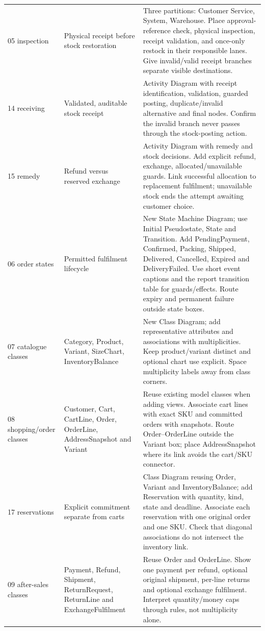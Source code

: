 \begin{longtable}{P{.15\linewidth}P{.3\linewidth}P{.43\linewidth}}
05 inspection & Physical receipt before stock restoration & Three partitions: Customer Service, System, Warehouse. Place approval-reference check, physical inspection, receipt validation, and once-only restock in their responsible lanes. Give invalid/valid receipt branches separate visible destinations.\\
14 receiving & Validated, auditable stock receipt & Activity Diagram with receipt identification, validation, guarded posting, duplicate/invalid alternative and final nodes. Confirm the invalid branch never passes through the stock-posting action.\\
15 remedy & Refund versus reserved exchange & Activity Diagram with remedy and stock decisions. Add explicit refund, exchange, allocated/unavailable guards. Link successful allocation to replacement fulfilment; unavailable stock ends the attempt awaiting customer choice.\\
06 order states & Permitted fulfilment lifecycle & New State Machine Diagram; use Initial Pseudostate, State and Transition. Add PendingPayment, Confirmed, Packing, Shipped, Delivered, Cancelled, Expired and DeliveryFailed. Use short event captions and the report transition table for guards/effects. Route expiry and permanent failure outside state boxes.\\
07 catalogue classes & Category, Product, Variant, SizeChart, InventoryBalance & New Class Diagram; add representative attributes and associations with multiplicities. Keep product/variant distinct and optional chart use explicit. Space multiplicity labels away from class corners.\\
08 shopping/order classes & Customer, Cart, CartLine, Order, OrderLine, AddressSnapshot and Variant & Reuse existing model classes when adding views. Associate cart lines with exact SKU and committed orders with snapshots. Route Order--OrderLine outside the Variant box; place AddressSnapshot where its link avoids the cart/SKU connector.\\
17 reservations & Explicit commitment separate from carts & Class Diagram reusing Order, Variant and InventoryBalance; add Reservation with quantity, kind, state and deadline. Associate each reservation with one original order and one SKU. Check that diagonal associations do not intersect the inventory link.\\
09 after-sales classes & Payment, Refund, Shipment, ReturnRequest, ReturnLine and ExchangeFulfilment & Reuse Order and OrderLine. Show one payment per refund, optional original shipment, per-line returns and optional exchange fulfilment. Interpret quantity/money caps through rules, not multiplicity alone.\\

\end{longtable}
